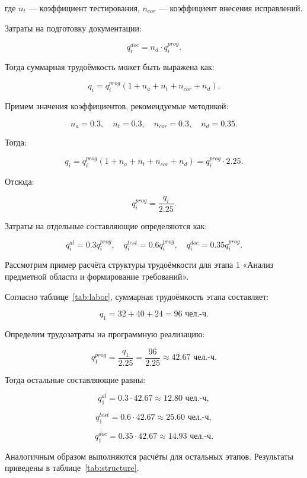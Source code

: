 где $n_t$ --- коэффициент тестирования, $n_{cor}$ --- коэффициент
внесения исправлений.

Затраты на подготовку документации:

\begin{equation}
q_i^{doc} = n_d \cdot q_i^{prog}.
\end{equation}

Тогда суммарная трудоёмкость может быть выражена как:

\begin{equation}
q_i = q_i^{prog}(1 + n_a + n_t + n_{cor} + n_d).
\end{equation}

Примем значения коэффициентов, рекомендуемые методикой:

\[
n_a = 0.3, \quad n_t = 0.3, \quad n_{cor} = 0.3, \quad n_d = 0.35.
\]

Тогда:

\[
q_i = q_i^{prog}(1 + n_a + n_t + n_{cor} + n_d) =
q_i^{prog} \cdot 2.25.
\]

Отсюда:

\begin{equation}
q_i^{prog} = \frac{q_i}{2.25}.
\end{equation}

Затраты на отдельные составляющие определяются как:

\[
q_i^{al} = 0.3q_i^{prog}, \quad
q_i^{test} = 0.6q_i^{prog}, \quad
q_i^{doc} = 0.35q_i^{prog}.
\]

Рассмотрим пример расчёта структуры трудоёмкости для этапа 1
«Анализ предметной области и формирование требований».

Согласно таблице~\ref{tab:labor}, суммарная трудоёмкость этапа
составляет:

\[
q_1 = 32 + 40 + 24 = 96 \text{ чел.-ч}.
\]

Определим трудозатраты на программную реализацию:

\[
q_1^{prog} = \frac{q_1}{2.25} = \frac{96}{2.25} \approx
42.67 \text{ чел.-ч}.
\]

Тогда остальные составляющие равны:

\[
q_1^{al} = 0.3 \cdot 42.67 \approx 12.80 \text{ чел.-ч},
\]

\[
q_1^{test} = 0.6 \cdot 42.67 \approx 25.60 \text{ чел.-ч},
\]

\[
q_1^{doc} = 0.35 \cdot 42.67 \approx 14.93 \text{ чел.-ч}.
\]

Аналогичным образом выполняются расчёты для остальных этапов.
Результаты приведены в таблице~\ref{tab:structure}.

